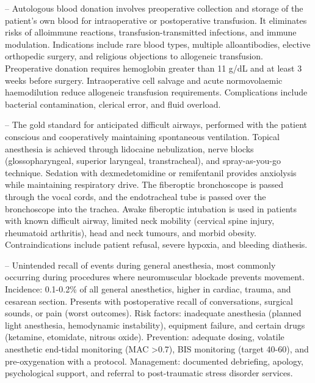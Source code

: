 -- Autologous blood donation involves preoperative collection and storage of the patient's own blood for intraoperative or postoperative transfusion. It eliminates risks of alloimmune reactions, transfusion-transmitted infections, and immune modulation. Indications include rare blood types, multiple alloantibodies, elective orthopedic surgery, and religious objections to allogeneic transfusion. Preoperative donation requires hemoglobin greater than 11 g/dL and at least 3 weeks before surgery. Intraoperative cell salvage and acute normovolaemic haemodilution reduce allogeneic transfusion requirements. Complications include bacterial contamination, clerical error, and fluid overload.

-- The gold standard for anticipated difficult airways, performed with the patient conscious and cooperatively maintaining spontaneous ventilation. Topical anesthesia is achieved through lidocaine nebulization, nerve blocks (glossopharyngeal, superior laryngeal, transtracheal), and spray-as-you-go technique. Sedation with dexmedetomidine or remifentanil provides anxiolysis while maintaining respiratory drive. The fiberoptic bronchoscope is passed through the vocal cords, and the endotracheal tube is passed over the bronchoscope into the trachea. Awake fiberoptic intubation is used in patients with known difficult airway, limited neck mobility (cervical spine injury, rheumatoid arthritis), head and neck tumours, and morbid obesity. Contraindications include patient refusal, severe hypoxia, and bleeding diathesis.

-- Unintended recall of events during general anesthesia, most commonly occurring during procedures where neuromuscular blockade prevents movement. Incidence: 0.1-0.2\% of all general anesthetics, higher in cardiac, trauma, and cesarean section. Presents with postoperative recall of conversations, surgical sounds, or pain (worst outcomes). Risk factors: inadequate anesthesia (planned light anesthesia, hemodynamic instability), equipment failure, and certain drugs (ketamine, etomidate, nitrous oxide). Prevention: adequate dosing, volatile anesthetic end-tidal monitoring (MAC >0.7), BIS monitoring (target 40-60), and pre-oxygenation with a protocol. Management: documented debriefing, apology, psychological support, and referral to post-traumatic stress disorder services.

